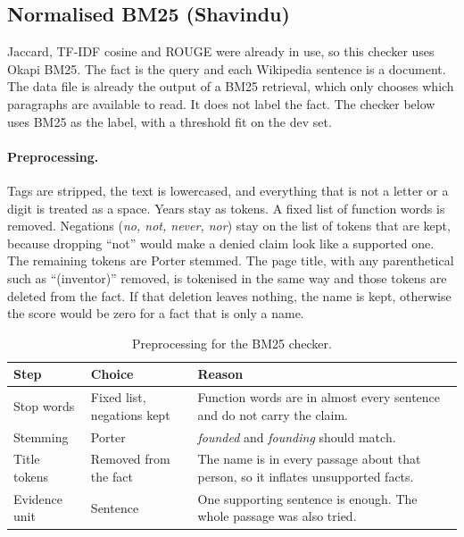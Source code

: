 \documentclass[12pt,a4paper]{article}
\begin{document}
\subsection{Normalised BM25 (Shavindu)}
\label{sec:p1shavindu}
Jaccard, TF-IDF cosine and ROUGE were already in use, so this checker uses Okapi BM25. The fact is the query and each Wikipedia sentence is a document. The data file is already the output of a BM25 retrieval, which only chooses which paragraphs are available to read. It does not label the fact. The checker below uses BM25 as the label, with a threshold fit on the dev set.

\paragraph{Preprocessing.}
Tags are stripped, the text is lowercased, and everything that is not a letter or a digit is treated as a space. Years stay as tokens. A fixed list of function words is removed. Negations (\textit{no, not, never, nor}) stay on the list of tokens that are kept, because dropping ``not'' would make a denied claim look like a supported one. The remaining tokens are Porter stemmed. The page title, with any parenthetical such as ``(inventor)'' removed, is tokenised in the same way and those tokens are deleted from the fact. If that deletion leaves nothing, the name is kept, otherwise the score would be zero for a fact that is only a name.

\begin{table}[H]
\centering
\small
\begin{tabularx}{\linewidth}{L{2.4cm} L{4.2cm} Y}
\toprule
Step & Choice & Reason \\
\midrule
Stop words & Fixed list, negations kept & Function words are in almost every sentence and do not carry the claim. \\
Stemming & Porter & \textit{founded} and \textit{founding} should match. \\
Title tokens & Removed from the fact & The name is in every passage about that person, so it inflates unsupported facts. \\
Evidence unit & Sentence & One supporting sentence is enough. The whole passage was also tried. \\
\bottomrule
\end{tabularx}
\caption{Preprocessing for the BM25 checker.}
\label{tab:shavindu-prep}
\end{table}
\end{document}
